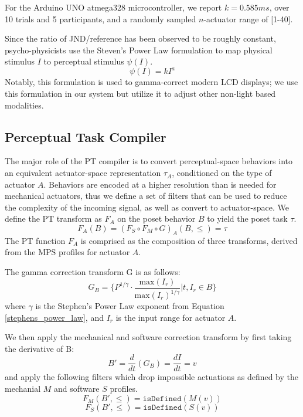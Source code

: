 \documentclass{sigchi}
\begin{document}
  For the Arduino UNO atmega328 microcontroller, we report $k = 0.585 ms$, over 10 trials and 5 participants, and a randomly sampled $n$-actuator range of [1-40]. 
  
  Since the ratio of JND/reference has been observed to be roughly constant,  psycho-physicists use the Steven's Power Law formulation to map physical stimulus $I$ to perceptual stimulus $\psi(I)$.
  \begin{equation}
    \psi(I) = kI^a
    \label{stephens_power_law}
  \end{equation}
  Notably, this formulation is used to gamma-correct modern LCD displays; we use this formulation in our system but utilize it to adjust other non-light based modalities. 
  


  \subsection{Perceptual Task Compiler}

    The major role of the PT compiler is to convert perceptual-space behaviors into an equivalent actuator-space representation $\tau_A$, conditioned on the type of actuator $A$. 
    Behaviors are encoded at a higher resolution than is needed for mechanical actuators, thus we define a set of filters that can be used to reduce the complexity of the incoming signal, as well as convert to actuator-space. We define the PT transform as $F_A$ on the poset behavior $B$ to yield the poset task $\tau$.  
    \begin{equation}
      F_A(B) = (F_S \circ F_M \circ G)_A (B, \leq) = \tau
    \end{equation}
    The PT function $F_A$ is comprised as the composition of three transforms, derived from the MPS profiles for actuator $A$. 

    The gamma correction transform G is as follows:
    $$ G_{B} = \{P^{1/\gamma} \cdot \frac{\text{max}(I_r)}{\text{max}(I_r)^{1/\gamma}} \vert t, I_r \in B\} $$
    where $\gamma$ is the Stephen's Power Law exponent from Equation \ref{stephens_power_law}, and $I_r$ is the input range for actuator $A$. 

    We then apply the mechanical and software correction transform by first taking the derivative of B: 
    $$ B' = \frac{d}{dt}(G_{B}) = \frac{dI}{dt} = v  $$
    and apply the following filters which drop impossible actuations as defined by the mechanial $M$ and software $S$ profiles.
    $$ F_M(B', \leq)  = \texttt{isDefined}(M(v))$$
    $$ F_S(B', \leq) = \texttt{isDefined}(S(v))$$
\end{document}
